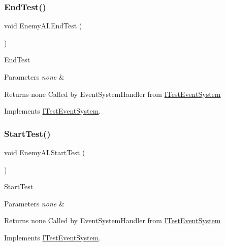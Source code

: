 \subsubsection{\texorpdfstring{End\+Test()}{EndTest()}}
{\footnotesize\ttfamily void Enemy\+A\+I.\+End\+Test (\begin{DoxyParamCaption}{ }\end{DoxyParamCaption})\hspace{0.3cm}{\ttfamily [inline]}}

End\+Test 
\begin{DoxyParams}{Parameters}
{\em none} & \\
\hline
\end{DoxyParams}
\begin{DoxyReturn}{Returns}
none Called by Event\+System\+Handler from \mbox{\hyperlink{interface_i_test_event_system}{I\+Test\+Event\+System}} 
\end{DoxyReturn}


Implements \mbox{\hyperlink{interface_i_test_event_system_ae8eda94179d81c4c839a32432216df7b}{I\+Test\+Event\+System}}.

\mbox{\label{class_enemy_a_i_a8d23dd153a4f273abaae5c174d10a6d2}} 
\subsubsection{\texorpdfstring{Start\+Test()}{StartTest()}}
{\footnotesize\ttfamily void Enemy\+A\+I.\+Start\+Test (\begin{DoxyParamCaption}{ }\end{DoxyParamCaption})\hspace{0.3cm}{\ttfamily [inline]}}

Start\+Test 
\begin{DoxyParams}{Parameters}
{\em none} & \\
\hline
\end{DoxyParams}
\begin{DoxyReturn}{Returns}
none Called by Event\+System\+Handler from \mbox{\hyperlink{interface_i_test_event_system}{I\+Test\+Event\+System}} 
\end{DoxyReturn}


Implements \mbox{\hyperlink{interface_i_test_event_system_aefeb7857cc94ecb2bacb47975f6474bb}{I\+Test\+Event\+System}}.

\mbox{\label{class_enemy_a_i_a9c377a8c65147355decf5f02cf2785ea}} 

